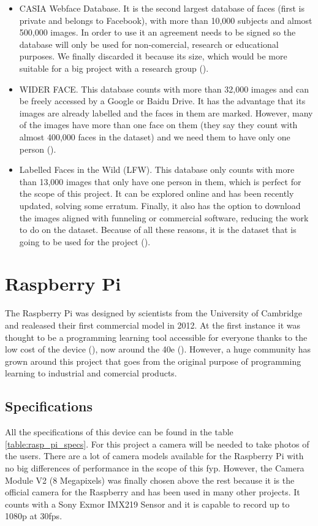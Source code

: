 \begin{itemize}
	\item CASIA Webface Database. It is the second largest database of faces (first is private and belongs to Facebook), with more than 10,000 subjects and almost 500,000 images. In order to use it an agreement needs to be signed so the database will only be used for non-comercial, research or educational purposes. We finally discarded it because its size, which would be more suitable for a big project with a research group (\cite{casia_db}). 
	\item WIDER FACE. This database counts with more than 32,000 images and can be freely accessed by a Google or Baidu Drive. It has the advantage that its images are already labelled and the faces in them are marked. However, many of the images have more than one face on them (they say they count with almost 400,000 faces in the dataset) and we need them to have only one person (\cite{widerf_db}).
	\item Labelled Faces in the Wild (LFW). This database only counts with more than 13,000 images that only have one person in them, which is perfect for the scope of this project. It can be explored online and has been recently updated, solving some erratum. Finally, it also has the option to download the images aligned with funneling or commercial software, reducing the work to do on the dataset. Because of all these reasons, it is the dataset that is going to be used for the project (\cite{lfw_db}).
\end{itemize}

\section{Raspberry Pi}	
The Raspberry Pi was designed by scientists from the University of Cambridge and realeased their first commercial model in 2012. At the first instance it was thought to be a programming learning tool accessible for everyone thanks to the low cost of the device (\cite{raspberry_pi_for_learning}), now around the 40e (\cite{price_raspberry_pi}). However, a huge community has grown around this project that goes from the original purpose of programming learning to industrial and comercial products.

	\subsection{Specifications}
	All the specifications of this device can be found in the table \ref{table:rasp_pi_specs}. For this project a camera will be needed to take photos of the users. There are a lot of camera models available for the Raspberry Pi with no big differences of performance in the scope of this \gls{fyp}. However, the Camera Module V2 (8 Megapixels) was finally chosen above the rest because it is the official camera for the Raspberry and has been used in many other projects. It counts with a Sony Exmor IMX219 Sensor and it is capable to record up to 1080p at 30fps.


